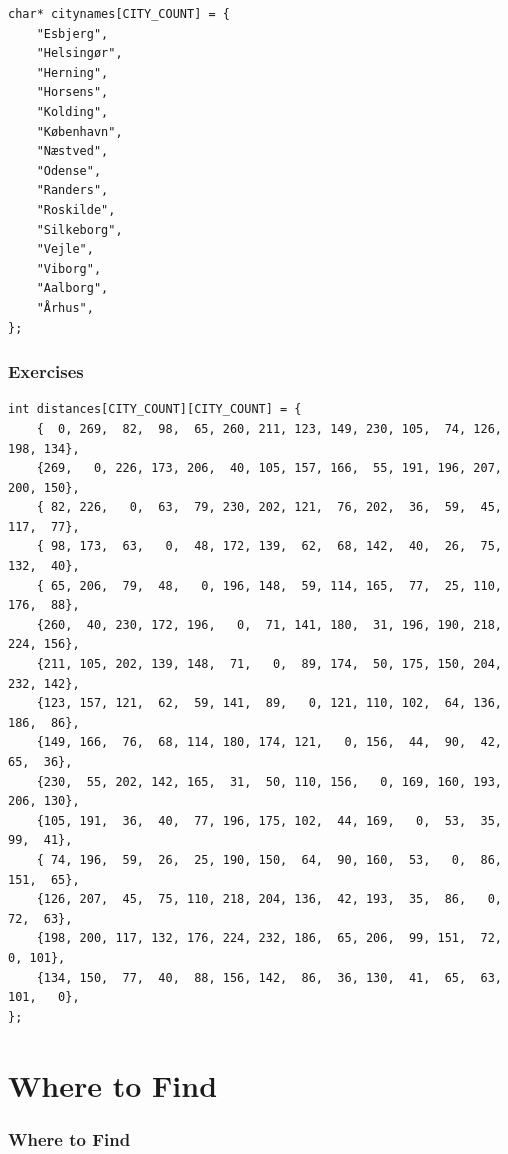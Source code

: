 {\begin{frame}[fragile]
\begin{verbatim}
char* citynames[CITY_COUNT] = {
    "Esbjerg",
    "Helsingør",
    "Herning",
    "Horsens",
    "Kolding",
    "København",
    "Næstved",
    "Odense",
    "Randers",
    "Roskilde",
    "Silkeborg",
    "Vejle",
    "Viborg",
    "Aalborg",
    "Århus",
};
    \end{verbatim}
\end{frame}
\begin{frame}[fragile]
    \frametitle{Exercises  }
    \vspace{5mm}
    \begin{verbatim}
int distances[CITY_COUNT][CITY_COUNT] = {
    {  0, 269,  82,  98,  65, 260, 211, 123, 149, 230, 105,  74, 126, 198, 134},
    {269,   0, 226, 173, 206,  40, 105, 157, 166,  55, 191, 196, 207, 200, 150},
    { 82, 226,   0,  63,  79, 230, 202, 121,  76, 202,  36,  59,  45, 117,  77},
    { 98, 173,  63,   0,  48, 172, 139,  62,  68, 142,  40,  26,  75, 132,  40},
    { 65, 206,  79,  48,   0, 196, 148,  59, 114, 165,  77,  25, 110, 176,  88},
    {260,  40, 230, 172, 196,   0,  71, 141, 180,  31, 196, 190, 218, 224, 156},
    {211, 105, 202, 139, 148,  71,   0,  89, 174,  50, 175, 150, 204, 232, 142},
    {123, 157, 121,  62,  59, 141,  89,   0, 121, 110, 102,  64, 136, 186,  86},
    {149, 166,  76,  68, 114, 180, 174, 121,   0, 156,  44,  90,  42,  65,  36},
    {230,  55, 202, 142, 165,  31,  50, 110, 156,   0, 169, 160, 193, 206, 130},
    {105, 191,  36,  40,  77, 196, 175, 102,  44, 169,   0,  53,  35,  99,  41},
    { 74, 196,  59,  26,  25, 190, 150,  64,  90, 160,  53,   0,  86, 151,  65},
    {126, 207,  45,  75, 110, 218, 204, 136,  42, 193,  35,  86,   0,  72,  63},
    {198, 200, 117, 132, 176, 224, 232, 186,  65, 206,  99, 151,  72,   0, 101},
    {134, 150,  77,  40,  88, 156, 142,  86,  36, 130,  41,  65,  63, 101,   0},
};
    \end{verbatim}
\end{frame}

}


\section{Where to Find}
\begin{frame}
  \frametitle{\textbf{Where to Find}}
  \vspace{0mm}
  \begin{center}
    
  \end{center}
\end{frame}

